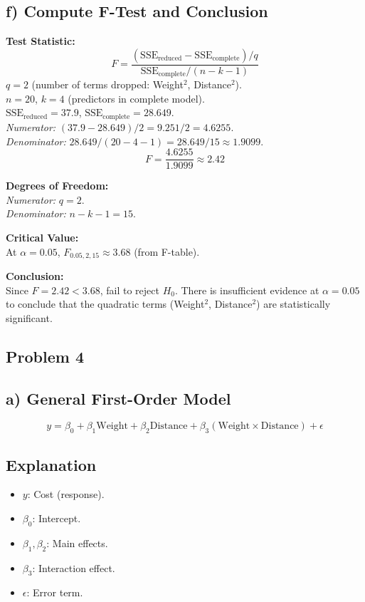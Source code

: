 \documentclass{article}
\begin{document}
\subsection*{f) Compute F-Test and Conclusion}
\textbf{Test Statistic:} \\
\[
F = \frac{(\text{SSE}_{\text{reduced}} - \text{SSE}_{\text{complete}}) / q}{\text{SSE}_{\text{complete}} / (n - k - 1)}
\]
\( q = 2 \) (number of terms dropped: Weight\(^2\), Distance\(^2\)). \\
\( n = 20 \), \( k = 4 \) (predictors in complete model). \\
\( \text{SSE}_{\text{reduced}} = 37.9 \), \( \text{SSE}_{\text{complete}} = 28.649 \). \\
\textit{Numerator:} \( (37.9 - 28.649) / 2 = 9.251 / 2 = 4.6255 \). \\
\textit{Denominator:} \( 28.649 / (20 - 4 - 1) = 28.649 / 15 \approx 1.9099 \). \\
\[
F = \frac{4.6255}{1.9099} \approx 2.42
\]

\textbf{Degrees of Freedom:} \\
\textit{Numerator:} \( q = 2 \). \\
\textit{Denominator:} \( n - k - 1 = 15 \).

\textbf{Critical Value:} \\
At \( \alpha = 0.05 \), \( F_{0.05, 2, 15} \approx 3.68 \) (from F-table).

\textbf{Conclusion:} \\
Since \( F = 2.42 < 3.68 \), fail to reject \( H_0 \). There is insufficient evidence at \( \alpha = 0.05 \) to conclude that the quadratic terms (Weight\(^2\), Distance\(^2\)) are statistically significant.





\newpage
\subsection*{Problem 4}
\subsection*{a) General First-Order Model}
\[
y = \beta_0 + \beta_1 \text{Weight} + \beta_2 \text{Distance} + \beta_3 (\text{Weight} \times \text{Distance}) + \epsilon
\]

\subsection*{Explanation}
\begin{itemize}
    \item \( y \): Cost (response).
    \item \( \beta_0 \): Intercept.
    \item \( \beta_1, \beta_2 \): Main effects.
    \item \( \beta_3 \): Interaction effect.
    \item \( \epsilon \): Error term.
\end{itemize}
\newpage
\end{document}

